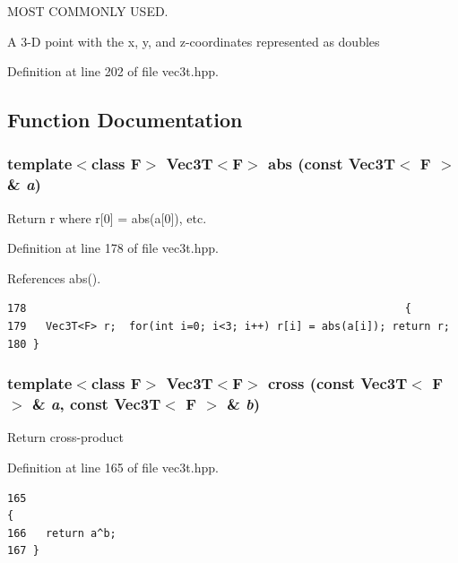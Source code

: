 MOST COMMONLY USED. 

A 3-D point with the x, y, and z-coordinates represented as doubles 

Definition at line 202 of file vec3t.hpp.

\subsection{Function Documentation}
\subsubsection{\setlength{\rightskip}{0pt plus 5cm}template$<$class F$>$ {\bf Vec3T}$<$F$>$ abs (const {\bf Vec3T}$<$ F $>$ \& {\em a})\hspace{0.3cm}{\tt  [inline]}}\label{vec3t_8hpp_d6ad0422a59f823578b14091decc5ad0_d6ad0422a59f823578b14091decc5ad0}


Return r where r[0] = abs(a[0]), etc. 

Definition at line 178 of file vec3t.hpp.

References abs().

\footnotesize\begin{verbatim}178                                                           {
179   Vec3T<F> r;  for(int i=0; i<3; i++) r[i] = abs(a[i]); return r;
180 }
\end{verbatim}\normalsize 


\subsubsection{\setlength{\rightskip}{0pt plus 5cm}template$<$class F$>$ {\bf Vec3T}$<$F$>$ cross (const {\bf Vec3T}$<$ F $>$ \& {\em a}, const {\bf Vec3T}$<$ F $>$ \& {\em b})\hspace{0.3cm}{\tt  [inline]}}\label{vec3t_8hpp_4aca0c35a9ec4f5839b51f15f6126303_4aca0c35a9ec4f5839b51f15f6126303}


Return cross-product 

Definition at line 165 of file vec3t.hpp.

\footnotesize\begin{verbatim}165                                                                                     { 
166   return a^b; 
167 }
\end{verbatim}\normalsize 


